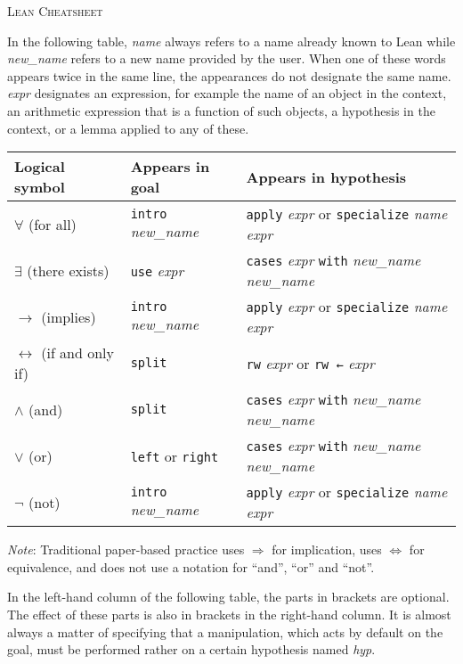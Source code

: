 \documentclass[a4paper]{article}
\newcommand{\lean}[1]{{\tt #1}}
\newcommand{\nv}{\textit{new\_name} }
\newcommand{\nom}{\textit{name} }
\newcommand{\expr}{\textit{expr} }
\newcommand{\hyp}{\textit{hyp}\xspace}
\begin{document}
\pagestyle{empty}
\begin{center}
 \large\textsc{Lean Cheatsheet}
\end{center}

In the following table,
\nom always refers to a name already known to Lean
while \nv refers to a new name provided by the user.
When one of these words appears twice in the same line,
the appearances do not designate the same name.
\expr designates an expression,
for example the name of an object in the context,
an arithmetic expression that is a function of such objects,
a hypothesis in the context,
or a lemma applied to any of these.

\begin{center}
\setlength\tabcolsep{1.4cm}
\def\arraystretch{1.5}
\begin{tabular}{@{}lll@{}}
  \toprule
  Logical symbol & Appears in goal & Appears in hypothesis \\
  \midrule
 $\forall$ (for all) & \lean{intro} \nv & \lean{apply} \expr or \lean{specialize} \nom \expr  \\
 $\exists$ (there exists) & \lean{use} \expr & \lean{cases} \expr \lean{with} \nv \nv \\
 $\to$ (implies) & \lean{intro} \nv & \lean{apply} \expr or \lean{specialize} \nom \expr \\
 $\leftrightarrow$ (if and only if) & \lean{split}  & \lean{rw} \expr or \lean{rw ←} \expr\\
 $\land$ (and) & \lean{split} & \lean{cases} \expr \lean{with} \nv \nv \\
 $\lor$ (or) & \lean{left} or \lean{right} & \lean{cases} \expr \lean{with} \nv \nv \\
 $\lnot$ (not) & \lean{intro} \nv & \lean{apply} \expr or \lean{specialize} \nom \expr  \\
  \bottomrule
\end{tabular}
\end{center}

\noindent
\emph{Note}:
Traditional paper-based practice uses $\Rightarrow$ for implication,
uses $\iff$ for equivalence,
and does not use a notation for ``and'', ``or'' and ``not''.

\medskip
\noindent
In the left-hand column of the following table,
the parts in brackets are optional.
The effect of these parts is also in brackets in the right-hand column.
It is almost always a matter of specifying that a manipulation,
which acts by default on the goal,
must be performed rather on a certain hypothesis named \hyp.
\end{document}
